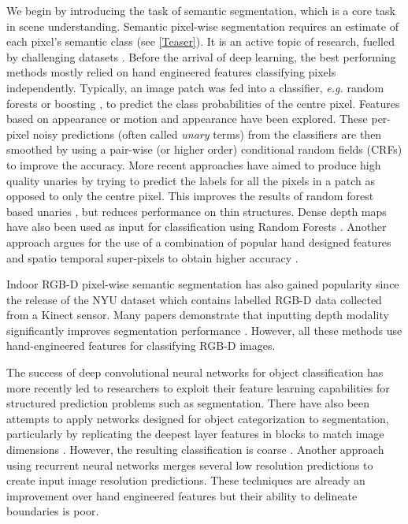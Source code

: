 We begin by introducing the task of semantic segmentation, which is a core task in scene understanding. Semantic pixel-wise segmentation requires an estimate of each pixel's semantic class (see \cref{Teaser}).
It is an active topic of research, fuelled by challenging datasets \citep{brostow2009semantic,silberman2012indoor,Geiger2012CVPR,pascal,song2015sun,Cordts2016Cityscapes}. Before the arrival of deep learning, the best performing methods mostly relied on hand engineered features classifying pixels independently. Typically, an image patch was fed into a classifier, \textit{e.g.} random forests \citep{Jamie2,brostow2008segmentation} or boosting \citep{Sturgess,LadickyECCV}, to predict the class probabilities of the centre pixel. Features based on appearance \citep{Jamie2} or motion and appearance \citep{brostow2008segmentation,Sturgess, LadickyECCV} have been explored. These per-pixel noisy predictions (often called \textit{unary} terms) from the classifiers are then smoothed by using a pair-wise (or higher order) conditional random fields (CRFs) \citep{Sturgess,LadickyECCV} to improve the accuracy. More recent approaches have aimed to produce high quality unaries by trying to predict the labels for all the pixels in a patch as opposed to only the centre pixel. This improves the results of random forest based unaries \citep{kontschieder2011structured}, but reduces performance on thin structures. Dense depth maps have also been used as input for classification using Random Forests \citep{zhang2010semantic}. Another approach argues for the use of a combination of popular hand designed features and spatio temporal super-pixels to obtain higher accuracy \citep{tighe2013superparsing}.

Indoor RGB-D pixel-wise semantic segmentation has also gained popularity since the release of the NYU dataset \citep{silberman2012indoor} which contains labelled RGB-D data collected from a Kinect sensor. Many papers demonstrate that inputting depth modality significantly improves segmentation performance \citep{ren2012rgb,silberman2012indoor,Hermans14ICRA,gupta2013perceptual}. However, all these methods use hand-engineered features for classifying RGB-D images. 

The success of deep convolutional neural networks for object classification has more recently led to researchers to exploit their feature learning capabilities for structured prediction problems such as segmentation. There have also been attempts to apply networks designed for object categorization to segmentation, particularly by replicating the deepest layer features in blocks to match image dimensions \citep{FarabetPAMI,FarabetPurityCover,Grangier,Gatta}. However, the resulting classification is coarse \citep{Grangier}. Another approach using recurrent neural networks \citep{pinheiro2014recurrent} merges several low resolution predictions to create input image resolution predictions. These techniques are already an improvement over hand engineered features \citep{FarabetPAMI} but their ability to delineate boundaries is poor. 

